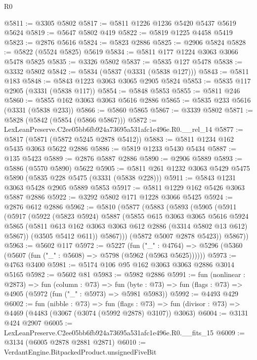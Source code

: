 \begin{lexlean}{R0}
\begin{coremodule}
@5811 := @3305 @5802
@5817 := @5811 @1226 @1236 @5420 @5437 @5619 @5624
@5819 := @5647 @5802 @419
@5822 := @5819 @1225 @4458 @5419
@5823 := @2876 @5616
@5824 := @5823 @2886
@5825 := @2906 @5824
@5828 := @5822 (@5524 @5825) @5619
@5834 := @5811 @177 @1224 @3063 @3066 @5478 @5825
@5835 := @3326 @5802
@5837 := @5835 @127 @5478
@5838 := @3332 @5802
@5842 := @5834 (@5837 (@3331 (@5838 @127)))
@5843 := @5811 @183
@5848 := @5843 @1223 @3063 @3065 @2905 @5824
@5853 := @5835 @117 @2905 (@3331 (@5838 @117))
@5854 := @5848 @5853
@5855 := @5811 @246
@5860 := @5855 @162 @3063 @3063 @5616 @2886
@5865 := @5835 @233 @5616 (@3331 (@5838 @233))
@5866 := @5860 @5865
@5867 := @3339 @5802
@5871 := @5828 (@5842 (@5854 (@5866 @5867)))
@5872 := LexLeanPreserve.C2ee05bb6fb924a73695a531afc1e496e.R0.__rel_14
@5877 := @5817 (@5871 (@5872 @5245 @2878 @5412))
@5883 := @5811 @1234 @162 @5435 @3063 @5622 @2886
@5886 := @5819 @1233 @5430 @5434
@5887 := @135 @5423
@5889 := @2876 @5887 @2886
@5890 := @2906 @5889
@5893 := @5886 (@5570 @5890) @5622
@5905 := @5811 @261 @1232 @3063 @5429 @5475 @5890 (@5835 @228 @5475 (@3331 (@5838 @228)))
@5911 := @5843 @1231 @3063 @5428 @2905 @5889 @5853
@5917 := @5811 @1229 @162 @5426 @3063 @5887 @2886
@5922 := @3292 @5802 @171 @1228 @3066 @5425
@5924 := @2876 @612 @2886
@5962 := @5810
    (@5877
      (@5883
        (@5893
          (@5905
            (@5911
              (@5917
                (@5922
                  (@5823 @5924)
                  @5887
                  (@5855
                    @615
                    @3063
                    @3065
                    @5616
                    @5924
                    @5865
                    (@5811 @613 @162 @3063 @3063 @612 @2886 (@3314 @5802 @13 @612) @5867))
                  (@3505 @5412 @611))
                @5867)))
          (@5872 @5007 @2878 @5423))
        @5867))
@5963 := @5602 @117
@5972 := @5227
    (fun ("_" : @4764) => @5296 (@5360 (@5607 (fun ("_" : @5608) => @5798 (@5962 (@5963 @5625))))))
@5973 := @4763 @3400
@5981 := @5174 @106 @95 @162 @3063 @3063 @2886 @3014 @5165
@5982 := @5602 @81
@5983 := @5982 @2886
@5991 := fun (nonlinear : @2873) =>
  fun (column : @73) =>
  fun (byte : @73) => fun (flags : @73) => @4905 (@5972 (fun ("_" : @5973) => @5981 @5983))
@5992 := @4493 @429
@6002 := fun (nibble : @73) =>
  fun (flags : @73) =>
  fun (divisor : @73) => @4469 (@4483 (@3067 (@3074 (@5992 @2878) @3107)) @3063)
@6004 := @3131 @424 @2907
@6005 := LexLeanPreserve.C2ee05bb6fb924a73695a531afc1e496e.R0.__fits_15
@6009 := @3134 (@6005 @2878 @2881 @2871)
@6010 := VerdantEngine.BitpackedProduct.unsignedFiveBit

\end{coremodule}
\end{lexlean}
